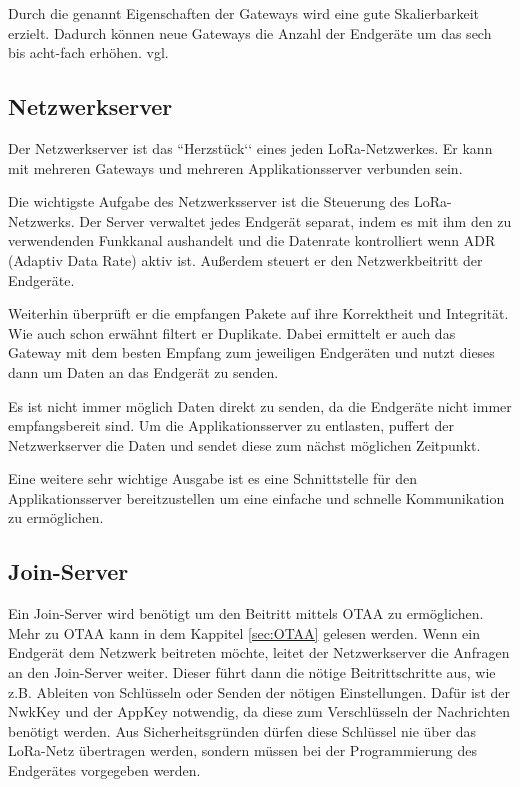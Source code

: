 \documentclass[a4paper, 12pt]{article}
\begin{document}
            Durch die genannt Eigenschaften der Gateways wird eine gute Skalierbarkeit erzielt. Dadurch können neue 
            Gateways die Anzahl der Endgeräte um das sech bis acht-fach erhöhen. vgl. \cite[S.10]{WhatIsLoRa}
        \subsection{Netzwerkserver}
            Der Netzwerkserver ist das ``Herzstück‘‘ eines jeden LoRa-Netzwerkes. Er kann mit mehreren Gateways und 
            mehreren Applikationsserver verbunden sein. 

            Die wichtigste Aufgabe des Netzwerksserver ist die Steuerung des LoRa-Netzwerks. Der Server 
            verwaltet jedes Endgerät separat, indem es mit ihm den zu verwendenden Funkkanal aushandelt und die Datenrate
             kontrolliert wenn ADR (Adaptiv Data Rate) aktiv ist. Außerdem steuert er den Netzwerkbeitritt der 
             Endgeräte.

            Weiterhin überprüft er die empfangen Pakete auf ihre Korrektheit und Integrität. Wie auch schon erwähnt 
            filtert er Duplikate.
            Dabei ermittelt er auch das Gateway mit dem besten Empfang zum jeweiligen Endgeräten und nutzt 
            dieses dann um Daten an das Endgerät zu senden.

            Es ist nicht immer möglich Daten direkt zu senden, da die Endgeräte nicht immer empfangsbereit sind. Um 
            die Applikationsserver zu entlasten, puffert der Netzwerkserver die Daten und sendet diese zum nächst 
            möglichen Zeitpunkt.

            Eine weitere sehr wichtige Ausgabe ist es eine Schnittstelle für den Applikationsserver bereitzustellen 
            um eine 
            einfache und schnelle Kommunikation zu ermöglichen.
        \subsection{Join-Server}
            Ein Join-Server wird benötigt um den Beitritt mittels OTAA zu ermöglichen. Mehr zu OTAA kann in dem 
            Kappitel \ref{sec:OTAA}  gelesen werden. Wenn ein Endgerät dem Netzwerk beitreten möchte, leitet 
            der Netzwerkserver die Anfragen an den Join-Server weiter. Dieser führt dann die nötige Beitrittschritte 
            aus, wie z.B. Ableiten von Schlüsseln oder Senden der nötigen Einstellungen. Dafür ist der NwkKey und 
            der AppKey notwendig, da diese zum Verschlüsseln der Nachrichten benötigt werden. 
            Aus Sicherheitsgründen dürfen diese Schlüssel nie über das LoRa-Netz übertragen werden, sondern müssen
            bei der Programmierung des Endgerätes vorgegeben werden. \cite[S. 9 f.]{LoRaBack}
\end{document}
